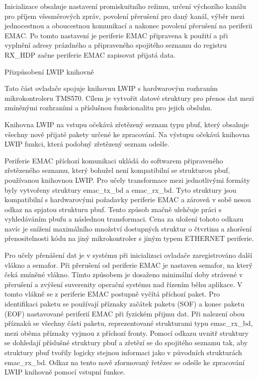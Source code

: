 Inicializace obsahuje nastavení promiskuitního režimu, určení výchozího kanálu pro příjem všesměrových zpráv, povolení přerušení pro daný kanál, výběr mezi jednocestnou a oboucestnou komunikací a nakonec povolení přerušení na periferii EMAC.
Po tomto nastavení je periferie EMAC připravena k použití a při vyplnění adresy prázdného a připraveného spojitého seznamu do registru RX\_HDP začne periferie EMAC zapisovat přijatá data.

\secc Přizpůsobení LWIP knihovně

Tato část ovladače spojuje knihovnu LWIP s hardwarovým rozhraním mikrokontroleru TMS570.
Cílem je vytvořit datové struktury pro přenos dat mezi zmíněnými rozhraními a příslušnou funkcionalitu pro jejich obsluhu.

Knihovna LWIP na vstupu očekává zřetězený seznam typu pbuf, který obsahuje všechny nově přijaté pakety určené ke zpracování.
Na výstupu očekává knihovna LWIP funkci, která podobný zřetězený seznam odešle.  

Periferie EMAC příchozí komunikaci ukládá do softwarem připraveného zřetězeného seznamu, který bohužel není kompatibilní se strukturou pbuf, používanou knihovnou LWIP.
Pro učely transformace mezi jednotlivými formáty byly vytvořeny struktury emac\_tx\_bd a emac\_rx\_bd.
Tyto struktury jsou kompatibilní s hardwarovými požadavky periferie EMAC a zároveň v sobě nesou odkaz na spjatou strukturu pbuf.
Tento způsob značně ulehčuje práci s vyhledáváním pbufu a následnou transformaci.
Cena za uložení tohoto odkazu navíc je snížení maximálního množství dostupných struktur o čtvrtinu a zhoršení přenositelnosti kódu na jiný mikrokontroler s jiným typem ETHERNET periferie.

Pro učely přenášení dat je v systému při inicializaci ovladače zaregistrováno další vlákno a semafor.
Při přerušení od periferie EMAC je nastaven semafor, na který čeká zmíněné vlákno.
Tímto způsobem je dosaženo minimální doby strávené v přerušení a zvýšení suverenity operační systému nad řízením běhu aplikace.
V tomto vlákně se z periferie EMAC postupně vyčítá příchozí paket.
Pro identifikaci paketu se používají příznaky začátek paketu (SOF) a konec paketu (EOF) nastavované periferií EMAC při fyzickém přijmu dat.
Při nalezení obou příznaků se všechny části paketu, reprezentované strukturami typu emac\_rx\_bd, mezi oběma příznaky vyjmou z příchozí fronty.
Pomocí odkazu uvnitř struktury se dohledají příslušné struktury pbuf a zřetězí se do spojitého seznamu tak, aby struktury pbuf tvořily logicky stejnou informaci jako v původních strukturách emac\_rx\_bd.
Odkaz na tento nově zformovaný řetězec se odešle ke zpracování LWIP knihovně pomocí vstupní funkce.

